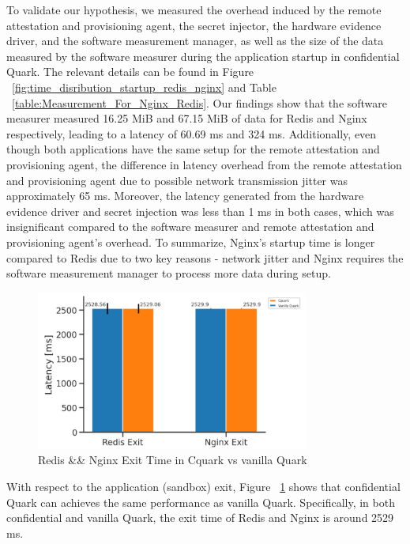 To validate our hypothesis, we measured the overhead induced by the remote attestation and provisioning agent, the secret injector, the hardware evidence driver, and the software measurement manager, as well as the size of the data measured by the software measurer during the application 
startup in confidential Quark. The relevant details can be found in Figure  ~\ref{fig:time_disribution_startup_redis_nginx} and Table ~\ref{table:Measurement_For_Nginx_Redis}. Our findings show that the software measurer measured 16.25 MiB and 67.15 MiB of data for Redis and Nginx respectively, 
leading to a latency of 60.69 ms and 324 ms. Additionally, even though both applications have the same setup for the remote attestation and provisioning agent, the difference in latency overhead from the remote attestation and provisioning agent due to possible network transmission jitter 
was approximately 65 ms. Moreover, the latency generated from the hardware evidence driver and secret injection was less than 1 ms in both cases, which was insignificant compared to the software measurer and remote attestation and provisioning agent's overhead. To summarize, 
Nginx's startup time is longer compared to Redis due to two key reasons - network jitter and Nginx requires the software measurement manager to process more data during setup.

\begin{figure}[H]
    \centering
    \includegraphics[width=0.8\textwidth]{images/reds_nginx_exit_comp.PNG}
    \caption[Redis \&\& Nginx Exit Time in Cquark vs vanilla Quark]{Redis \&\& Nginx Exit Time in Cquark vs vanilla Quark}
    \label{fig:reds_nginx_exit_comp}
\end{figure}


With respect to the application (sandbox) exit, Figure ~\ref{fig:reds_nginx_exit_comp}  shows that confidential Quark can achieves the same performance as vanilla Quark. Specifically, in both confidential and vanilla Quark, the exit time of Redis and Nginx is around 2529 ms.

